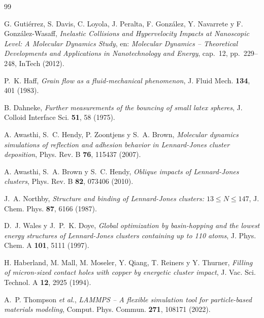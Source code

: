\documentclass[12pt,a4paper]{article}
\begin{document}

\begin{thebibliography}{99}

G. Gutiérrez, S. Davis, C. Loyola, J. Peralta, F. González, Y. Navarrete
y F. González-Wasaff,
\textit{Inelastic Collisions and Hypervelocity Impacts at Nanoscopic Level:
A Molecular Dynamics Study},
en: \textit{Molecular Dynamics -- Theoretical Developments and Applications
in Nanotechnology and Energy}, cap.~12, pp.~229--248, InTech (2012).

P.~K. Haff,
\textit{Grain flow as a fluid-mechanical phenomenon},
J. Fluid Mech. \textbf{134}, 401 (1983).

B. Dahneke,
\textit{Further measurements of the bouncing of small latex spheres},
J. Colloid Interface Sci. \textbf{51}, 58 (1975).

A. Awasthi, S.~C. Hendy, P. Zoontjens y S.~A. Brown,
\textit{Molecular dynamics simulations of reflection and adhesion behavior in
Lennard-Jones cluster deposition},
Phys. Rev. B \textbf{76}, 115437 (2007).

A. Awasthi, S.~A. Brown y S.~C. Hendy,
\textit{Oblique impacts of Lennard-Jones clusters},
Phys. Rev. B \textbf{82}, 073406 (2010).

J.~A. Northby,
\textit{Structure and binding of Lennard-Jones clusters: $13 \le N \le 147$},
J. Chem. Phys. \textbf{87}, 6166 (1987).

D.~J. Wales y J.~P.~K. Doye,
\textit{Global optimization by basin-hopping and the lowest energy structures
of Lennard-Jones clusters containing up to 110 atoms},
J. Phys. Chem. A \textbf{101}, 5111 (1997).

H. Haberland, M. Mall, M. Moseler, Y. Qiang, T. Reiners y Y. Thurner,
\textit{Filling of micron-sized contact holes with copper by energetic cluster
impact},
J. Vac. Sci. Technol. A \textbf{12}, 2925 (1994).

A.~P. Thompson \textit{et al.},
\textit{LAMMPS -- A flexible simulation tool for particle-based materials
modeling},
Comput. Phys. Commun. \textbf{271}, 108171 (2022).

\end{thebibliography}
\end{document}
